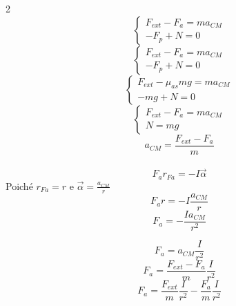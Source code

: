 \documentclass[twoside]{article}
\begin{document}
\begin{multicols}{2}
  \begin{equation*}
    \begin{cases}
      F_{ext} - F_{a} = m a_{CM} \\
      - F_p + N = 0
    \end{cases}
  \end{equation*}
  \begin{equation*}
    \begin{cases}
      F_{ext} - F_{a} = m a_{CM} \\
      - F_p + N = 0
    \end{cases}
  \end{equation*}
  \begin{equation*}
    \begin{cases}
      F_{ext} - \mu_{as}mg = m a_{CM} \\
      - m g + N = 0
    \end{cases}
  \end{equation*}
  \begin{equation*}
    \begin{cases}
      F_{ext} - F_{a} = m a_{CM} \\
      N = m g
    \end{cases}
  \end{equation*}
  \begin{equation*}
    a_{CM} = \frac{F_{ext} - F_{a}}{m}
  \end{equation*}
  \columnbreak
  \noindent
  \\
  \begin{equation*}
    F_{a} r_{Fa} = - I \vec{\alpha}
  \end{equation*}
  Poiché \(r_{Fa} = r\) e \(\vec{\alpha} = \displaystyle \frac{a_{CM}}{r}\)
  \begin{equation*}
    F_{a} r = - I \frac{a_{CM}}{r}
  \end{equation*}
  \begin{equation*}
    F_{a} = - \frac{I a_{CM}}{r^2}
  \end{equation*}
\end{multicols}
\begin{equation*}
  F_{a} = \displaystyle a_{CM} \frac{I}{r^2}
\end{equation*}
\begin{equation*}
  F_{a} = \displaystyle \frac{F_{ext} - F_{a}}{m} \frac{I}{r^2}
\end{equation*}
\begin{equation*}
  F_{a} = \displaystyle \frac{F_{ext}}{m} \frac{I}{r^2} - \frac{F_{a}}{m} \frac{I}{r^2}
\end{equation*}
\end{document}
